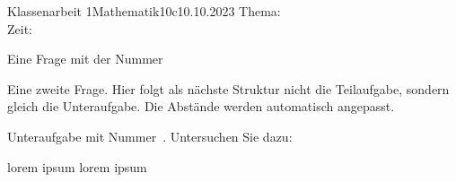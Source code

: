 \documentclass{../../exam2e}
\begin{document}

\begin{klassenarbeitskopf}{Klassenarbeit 1}{Mathematik}{10c}{10.10.2023}
	Thema:\\
	Zeit:	
\end{klassenarbeitskopf}


\begin{questions}

\begin{question}
	Eine Frage mit der Nummer \thequestion
{}
\end{question}%

\question Eine zweite Frage. Hier folgt als nächste Struktur nicht die Teilaufgabe, sondern gleich die Unteraufgabe. Die Abstände werden automatisch angepasst.
\begin{subparts}
		\subpart Unteraufgabe mit Nummer~. Untersuchen Sie  dazu:
	\begin{subsubparts}
		\subsubpart lorem ipsum
		\subsubpart lorem ipsum
	\end{subsubparts}
\end{subparts}








\end{questions}

\clearpage
\addtocounter{page}{-1}
\thispagestyle{empty} 



\end{document}
